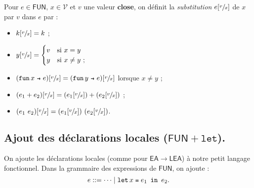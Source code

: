 \documentclass[../main]{subfiles}
\begin{document}
  \begin{defn}
    Pour $e \in \mathsf{FUN}$, $x \in \mathcal{V}$ et $v$ une valeur \textbf{close}, on définit la \textit{substitution} $e[\sfrac{v}{x}]$ de $x$ par $v$ dans $e$ par :
    \begin{itemize}
      \item $k[\sfrac{v}{x}] = k$ ;
      \item $y[\sfrac{v}{x}] = \begin{cases}
          v & \text{si}\ x = y\\
          y & \text{si}\ x \neq y\ ;
      \end{cases}$
    \item $(\fun x e)[\sfrac{v}{x}] = (\fun y e)[\sfrac{v}{x}]$ lorsque $x \neq y$ ;
      \item $(e_1 + e_2)[\sfrac{v}{x}] = (e_1[\sfrac{v}{x}]) + (e_2[\sfrac{v}{x}])$ ;
      \item $(e_1 \ e_2)[\sfrac{v}{x}] = (e_1[\sfrac{v}{x}]) \ (e_2[\sfrac{v}{x}])$.
    \end{itemize}
  \end{defn}

  \subsection{Ajout des déclarations locales ($\mathsf{FUN}+\mathtt{let}$).}

  On ajoute les déclarations locales (comme pour $\mathsf{EA}\to \mathsf{LEA}$) à notre petit langage fonctionnel.
  Dans la grammaire des expressions de $\mathsf{FUN}$, on ajoute :
  \[
    e ::= \cdots  \mid \letin x {e_1} {e_2}
  .\]
\end{document}
